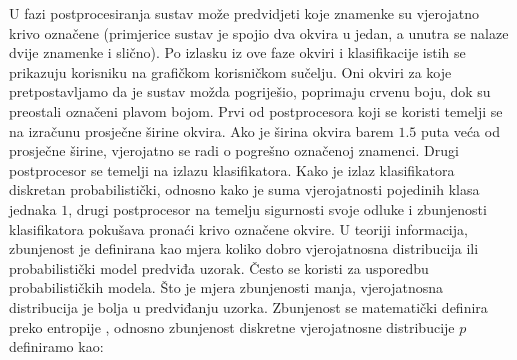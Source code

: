 \documentclass[times, utf8, diplomski]{fer}
\theoremstyle{definition}
\begin{document}
U fazi postprocesiranja sustav može predvidjeti koje znamenke su vjerojatno krivo označene (primjerice sustav je spojio dva okvira u jedan, a unutra se nalaze dvije znamenke i slično). Po izlasku iz ove faze okviri i klasifikacije istih se prikazuju korisniku na grafičkom korisničkom sučelju. Oni okviri za koje pretpostavljamo da je sustav možda pogriješio, poprimaju crvenu boju, dok su preostali označeni plavom bojom. Prvi od postprocesora koji se koristi temelji se na izračunu prosječne širine okvira. Ako je širina okvira barem $1.5$ puta veća od prosječne širine, vjerojatno se radi o pogrešno označenoj znamenci. Drugi postprocesor se temelji na izlazu klasifikatora. Kako je izlaz klasifikatora diskretan probabilistički, odnosno kako je suma vjerojatnosti pojedinih klasa jednaka $1$, drugi postprocesor na temelju sigurnosti  svoje odluke i zbunjenosti klasifikatora  pokušava pronaći krivo označene okvire. U teoriji informacija, zbunjenost je definirana kao mjera koliko dobro vjerojatnosna distribucija ili probabilistički model predviđa uzorak. Često se koristi za usporedbu probabilističkih modela. Što je mjera zbunjenosti manja, vjerojatnosna distribucija je bolja u predviđanju uzorka. Zbunjenost se matematički definira preko entropije , odnosno zbunjenost diskretne vjerojatnosne distribucije $p$ definiramo kao:
\end{document}

